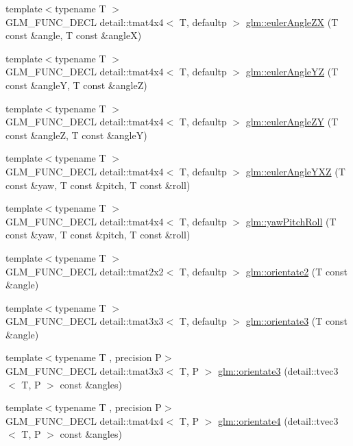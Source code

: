 \begin{DoxyCompactItemize}
\item 
{\footnotesize template$<$typename T $>$ }\\G\+L\+M\+\_\+\+F\+U\+N\+C\+\_\+\+D\+E\+CL detail\+::tmat4x4$<$ T, defaultp $>$ \hyperlink{group__gtx__euler__angles_ga5766bbe3f5b17b5c33ed21b2933ff278}{glm\+::euler\+Angle\+ZX} (T const \&angle, T const \&angleX)
\item 
{\footnotesize template$<$typename T $>$ }\\G\+L\+M\+\_\+\+F\+U\+N\+C\+\_\+\+D\+E\+CL detail\+::tmat4x4$<$ T, defaultp $>$ \hyperlink{group__gtx__euler__angles_ga4bff0f8324770261d3a6ddadd790ec22}{glm\+::euler\+Angle\+YZ} (T const \&angleY, T const \&angleZ)
\item 
{\footnotesize template$<$typename T $>$ }\\G\+L\+M\+\_\+\+F\+U\+N\+C\+\_\+\+D\+E\+CL detail\+::tmat4x4$<$ T, defaultp $>$ \hyperlink{group__gtx__euler__angles_gaeabd76319f5a19188a0423769950df76}{glm\+::euler\+Angle\+ZY} (T const \&angleZ, T const \&angleY)
\item 
{\footnotesize template$<$typename T $>$ }\\G\+L\+M\+\_\+\+F\+U\+N\+C\+\_\+\+D\+E\+CL detail\+::tmat4x4$<$ T, defaultp $>$ \hyperlink{group__gtx__euler__angles_gab9bc80f4f579efd8f0d161e8b58ff452}{glm\+::euler\+Angle\+Y\+XZ} (T const \&yaw, T const \&pitch, T const \&roll)
\item 
{\footnotesize template$<$typename T $>$ }\\G\+L\+M\+\_\+\+F\+U\+N\+C\+\_\+\+D\+E\+CL detail\+::tmat4x4$<$ T, defaultp $>$ \hyperlink{group__gtx__euler__angles_gaf6f927d06835272cd6a61ee3f8f65f5e}{glm\+::yaw\+Pitch\+Roll} (T const \&yaw, T const \&pitch, T const \&roll)
\item 
{\footnotesize template$<$typename T $>$ }\\G\+L\+M\+\_\+\+F\+U\+N\+C\+\_\+\+D\+E\+CL detail\+::tmat2x2$<$ T, defaultp $>$ \hyperlink{group__gtx__euler__angles_gab39476f0decc117783e02ba389a04ee7}{glm\+::orientate2} (T const \&angle)
\item 
{\footnotesize template$<$typename T $>$ }\\G\+L\+M\+\_\+\+F\+U\+N\+C\+\_\+\+D\+E\+CL detail\+::tmat3x3$<$ T, defaultp $>$ \hyperlink{group__gtx__euler__angles_ga2c94907d441c40beb413fe3284c1b267}{glm\+::orientate3} (T const \&angle)
\item 
{\footnotesize template$<$typename T , precision P$>$ }\\G\+L\+M\+\_\+\+F\+U\+N\+C\+\_\+\+D\+E\+CL detail\+::tmat3x3$<$ T, P $>$ \hyperlink{group__gtx__euler__angles_gab6a2a986916647ddedc94bbd2516f20c}{glm\+::orientate3} (detail\+::tvec3$<$ T, P $>$ const \&angles)
\item 
{\footnotesize template$<$typename T , precision P$>$ }\\G\+L\+M\+\_\+\+F\+U\+N\+C\+\_\+\+D\+E\+CL detail\+::tmat4x4$<$ T, P $>$ \hyperlink{group__gtx__euler__angles_ga3b9f62da9726cdad708df41712792082}{glm\+::orientate4} (detail\+::tvec3$<$ T, P $>$ const \&angles)
\end{DoxyCompactItemize}


